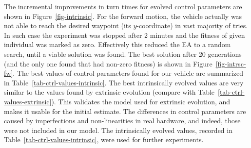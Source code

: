 The incremental improvements in turn times for evolved control parameters are shown in Figure~\ref{fig-intrinsic}. For the forward motion, the vehicle actually was not able to reach the desired waypoint (its $y$-coordinate) in vast majority of tries. In such case the experiment was stopped after 2 minutes and the fitness of given individual was marked as zero. Effectively this reduced the EA to a random search, until a viable solution was found. The best solution after 20 generations (and the only one found that had non-zero fitness) is shown in Figure~\ref{fig-intrsc-fw}. The best values of control parameters found for our vehicle are summarized in Table~\ref{tab-ctrl-values-intrinsic}. The best intrinsically evolved values are very similar to the values found by extrinsic evolution (compare with Table~\ref{tab-ctrl-values-extrinsic}). This validates the model used for extrinsic evolution, and makes it usable for the initial estimate. The differences in control parameters are caused by imperfections and non-linearities in real hardware, and indeed, those were not included in our model. The intrinsically evolved values, recorded in Table~\ref{tab-ctrl-values-intrinsic}, were used for further experiments.

